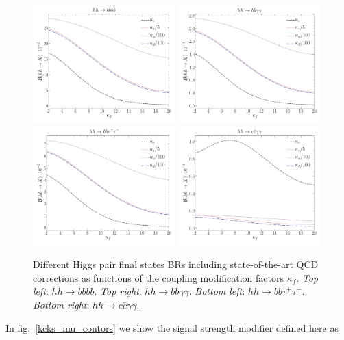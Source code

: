 \begin{figure}[!t]
	\centering
	\includegraphics[width = 0.49\textwidth]{./fig/br_bbbb_kf}
	\includegraphics[width = 0.49\textwidth]{./fig/br_bbgg_kf}
	\\
	\includegraphics[width = 0.49\textwidth]{./fig/br_bbll_kf}
	\includegraphics[width = 0.49\textwidth]{./fig/br_ccgg_kf}
	\caption{Different Higgs pair final states BRs including state-of-the-art QCD corrections as functions of the coupling modification factors $\kappa_f$. \textit{Top left}: $ hh \to b \bar b b \bar b$. \textit{Top right}: $ hh \to b \bar b \gamma \gamma$. \textit{Bottom left}: $ hh \to b \bar b \tau^+ \tau^-$. \textit{Bottom right}: $ hh \to c \bar c \gamma \gamma$. }
	\label{brs}
\end{figure}
In fig.~\ref{kcks_mu_contors} we show the signal strength modifier defined  here as\\

